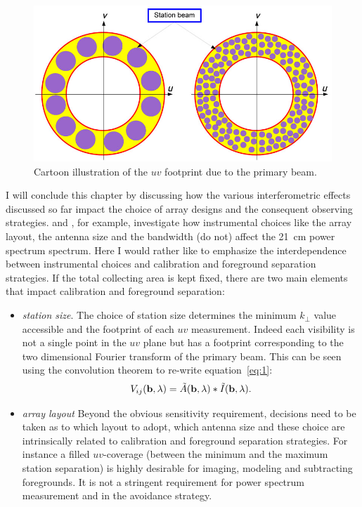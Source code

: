 {\begin{figure}[]
\begin{center}
\includegraphics[width=1.\textwidth]{Bernardi/uv_footprint}
\end{center}
\caption{Cartoon illustration of the $uv$ footprint due to the primary beam.}
\label{fig:fig4}
\end{figure}
I will conclude this chapter by discussing how the various interferometric effects discussed so far impact the choice of array designs and the consequent observing strategies. \cite{morales05} and \cite{parsons12b}, for example, investigate how instrumental choices like the array layout, the antenna size and the bandwidth (do not) affect the 21~cm power spectrum spectrum. Here I would rather like to emphasize the interdependence between instrumental choices and calibration and foreground separation strategies. If the total collecting area is kept fixed, there are two main elements that impact calibration and foreground separation:
\begin{itemize}
\item {\it station size}. The choice of station size determines the minimum $k_\perp$ value accessible and the footprint of each $uv$ measurement. Indeed each visibility is not a single point in the $uv$ plane but has a footprint corresponding to the two dimensional Fourier transform of the primary beam. This can be seen using the convolution theorem to re-write equation~\ref{eq:1}: 
\begin{equation}
V_{ij} ({\bf b}, \lambda) = \tilde{A} ({\bf b}, \lambda) \ast \tilde{I} ({\bf b}, \lambda).
\end{equation}

\item {\it array layout} Beyond the obvious sensitivity requirement, decisions need to be taken as to which layout to adopt, which antenna size and these choice are intrinsically related to calibration and foreground separation strategies. For instance a filled $uv$-coverage (between the minimum and the maximum station separation) is highly desirable for imaging, modeling and subtracting foregrounds. It is not a stringent requirement for power spectrum measurement and in the avoidance strategy. 
\end{itemize}



}
